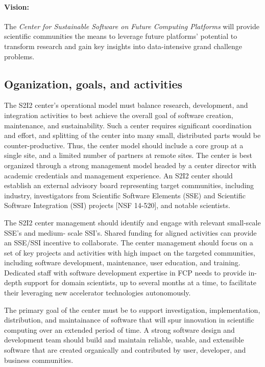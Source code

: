 \paragraph{Vision:} The \textit{Center for Sustainable Software on Future Computing Platforms} 
will provide scientific communities the means to leverage future platforms’ potential to transform research and gain key insights into data-intensive grand challenge problems.


\subsection{Oganization, goals, and activities}
The S2I2 center's operational model must balance research, development, and integration activities to best achieve the overall goal of software creation, maintenance, and sustainability. 
Such a center requires significant coordination and effort, and splitting of the center into many small, distributed parts would be counter-productive.  
Thus, the center model should include a core group at a single site, and a limited number of partners at remote sites. 
The center is best organized through a strong management model headed by a center director with academic credentials and management experience. 
An S2I2 center should establish an external advisory board representing target communities, 
including industry, investigators from Scientific Software Elements (SSE) and Scientific Software Integration (SSI) projects [NSF 14-520], and notable scientists.

The S2I2 center management should identify and engage with relevant small-scale SSE's and medium- scale SSI's. Shared funding for aligned activities can provide an SSE/SSI incentive to collaborate. 
The center management should focus on a set of key projects and activities with high impact on the targeted communities, including software development, maintenance, user education, and training. 
Dedicated staff with software development expertise in FCP needs to provide in-depth support for domain scientists, up to several months at a time, to facilitate their leveraging new accelerator technologies autonomously.

The primary goal of the center must be to support investigation, implementation, distribution, and maintainance 
of software that will spur innovation in scientific computing over an extended period of time. 
A strong software design and development team should build and maintain 
reliable, usable, and extensible software that are created organically and contributed by user, developer, and business communities.

